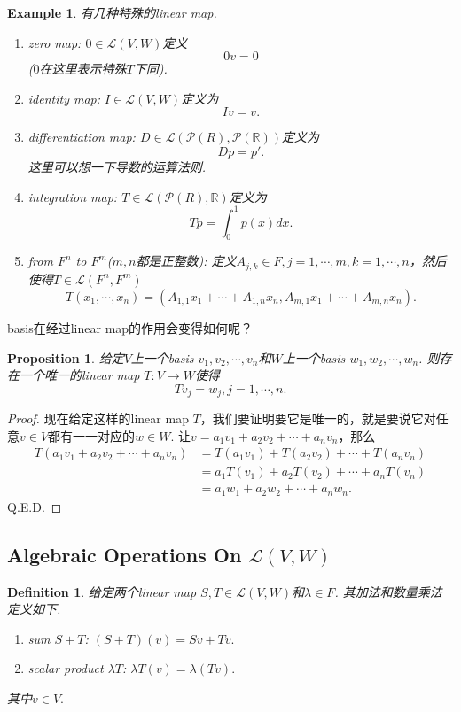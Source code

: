 \documentclass{article}
\newtheorem{proposition}[theorem]{Proposition}
\newtheorem{example}[theorem]{Example}
\newtheorem{definition}[theorem]{Definition}
\newcommand*{\xfunc}[4]{{#2}\colon{#3}{#1}{#4}}
\newcommand*{\func}[3]{\xfunc{\to}{#1}{#2}{#3}}
\begin{document}
\begin{example}
\rm 有几种特殊的linear map.
\begin{enumerate}
	\item zero map: $0 \in \mathcal{L}(V,W)$定义\[0v=0\]($0$在这里表示特殊$T$下同).
	\item identity map: $I \in \mathcal{L}(V,W)$定义为\[Iv=v.\]
	\item differentiation map: $D \in \mathcal{L}(\mathcal{P}({R}),\mathcal{P}(\mathbb{R}))$定义为\[Dp = p'.\] 这里可以想一下导数的运算法则.
	\item integration map: $T \in \mathcal{L}(\mathcal{P}({R}),\mathbb{R})$定义为\[Tp = \int_{0}^{1} p(x)dx.\]
	\item from $F^n$ to $F^m$($m,n$都是正整数): 定义$A_{j,k} \in F, j = 1,\cdots,m , k = 1,\cdots,n$，然后使得$T \in \mathcal{L}(F^n,F^m)$
	$$
		T(x_1,\cdots,x_n) = (A_{1,1}x_1+\cdots+A_{1,n}x_n,A_{m,1}x_1+\cdots+A_{m,n}x_n).
	$$
\end{enumerate}
\end{example}


{\color{red} basis在经过linear map的作用会变得如何呢}？

\begin{proposition}
\rm 给定$V$上一个basis $v_1,v_2,\cdots,v_n$和$W$上一个basis $w_1,w_2,\cdots,w_n$. 则存在一个唯一的linear map $\func{T}{V}{W}$使得
$$
	Tv_j = w_j, j = 1,\cdots,n.
$$
\end{proposition}

\begin{proof}
现在给定这样的linear map $T$，我们要证明要它是唯一的，就是要说它对任意$v \in V$都有一一对应的$w \in W$. 让$v = a_1v_1+a_2v_2+\cdots+a_nv_n$，那么
$$
\begin{aligned}
T(a_1v_1+a_2v_2+\cdots+a_nv_n) &= T(a_1v_1) + T(a_2v_2) + \cdots + T(a_nv_n)\\
 &= a_1T(v_1) + a_2T(v_2) + \cdots + a_nT(v_n)\\
 &= a_1w_1 + a_2w_2 + \cdots + a_nw_n.
\end{aligned}
$$
Q.E.D.
\end{proof}

\newpage
\subsection{Algebraic Operations On $\mathcal{L}(V,W)$}

\begin{definition}
\rm 给定两个linear map $S,T \in \mathcal{L}(V,W)$和$\lambda \in F$. 其加法和数量乘法定义如下. 
\begin{enumerate}
	\item sum $S+T$: $(S+T)(v) = Sv+Tv.$
	\item scalar product $\lambda T$: $\lambda T(v) = \lambda(Tv).$
\end{enumerate}
其中$v \in V.$
\end{definition}
\end{document}
